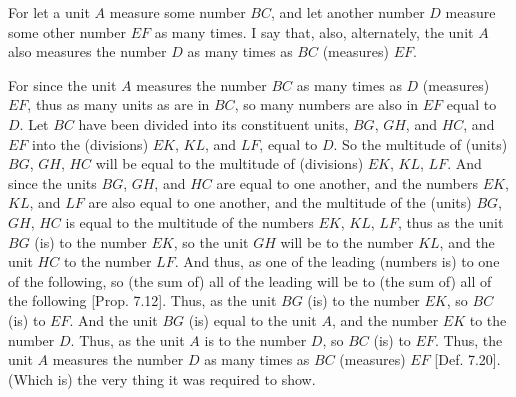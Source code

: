 \begin{Parallel}{}{}
{\epsfysize=0.65in
\centerline{}

For let a unit $A$ measure some number $BC$, and let another number $D$ measure some
other number $EF$ as many times. I  say that, also, alternately,
the unit $A$ also measures the number $D$ as many times
as $BC$ (measures) $EF$.

For since the unit $A$ measures the number $BC$ as many times as 
$D$ (measures) $EF$, thus as many units as are in $BC$, so many 
numbers are also in  $EF$ equal to $D$. Let $BC$ have been divided into its
constituent units, $BG$, $GH$, and $HC$, and $EF$ into the (divisions) $EK$, $KL$, and $LF$, equal
to $D$. So the multitude of (units) $BG$, $GH$, $HC$ will be equal to the multitude
of (divisions) $EK$, $KL$, $LF$. And since the units $BG$, $GH$, and $HC$ are equal to
one another, and the numbers $EK$, $KL$,  and $LF$ are also equal to one another, and the multitude of the (units) $BG$, $GH$, $HC$ is
equal to the multitude of the numbers $EK$, $KL$, $LF$,
thus as the unit $BG$ (is) to the number $EK$, so the unit $GH$ will be to the number $KL$, and
the unit $HC$ to the number $LF$. And thus, as one of the leading (numbers is) to
one of the following, so (the sum of) all of the leading will be to (the sum of) all of the following 
[Prop. 7.12]. Thus, as the unit $BG$ (is) to the number $EK$,
so $BC$ (is) to $EF$. And the unit $BG$ (is) equal to the unit $A$, and the number
$EK$ to the number $D$. Thus, as the unit $A$ is to the number $D$, so $BC$ (is) to
$EF$. Thus, the unit $A$ measures the number $D$ as many times as $BC$ (measures)
$EF$ [Def. 7.20]. (Which is) the very thing it was required to show.}
\end{Parallel}


\vspace{7pt}{\footnotesize\noindent$^\dag$ This proposition is a
special case of Prop.~7.9.}~\\

